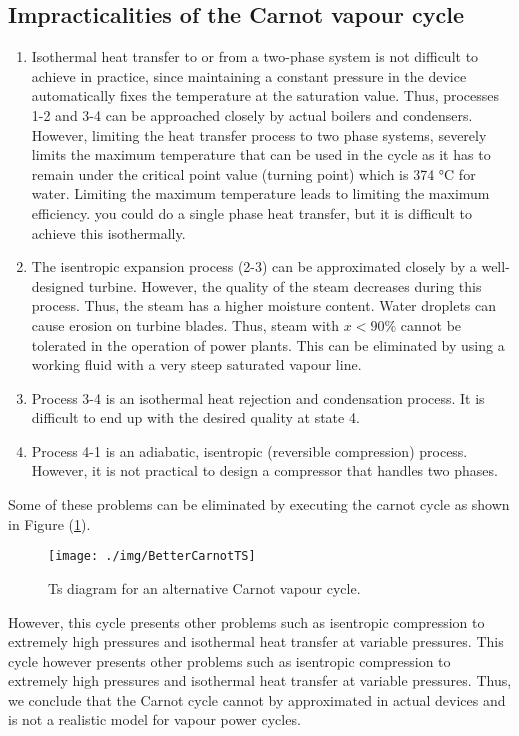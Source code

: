 \subsection{Impracticalities of the Carnot vapour cycle}
\begin{enumerate}[noitemsep]
  \item Isothermal heat transfer to or from a two-phase system is not difficult to achieve in practice, since maintaining a constant pressure in the device automatically fixes the temperature at the saturation value. Thus, processes 1-2 and 3-4 can be approached closely by actual boilers and condensers. However, limiting the heat transfer process to two phase systems, severely limits the maximum temperature that can be used in the cycle as it has to remain under the critical point value (turning point) which is 374 \si{\celsius} for water. Limiting the maximum temperature leads to limiting the maximum efficiency. you could do a single phase heat transfer, but it is difficult to achieve this isothermally.
  \item The isentropic expansion process (2-3) can be approximated closely by a well-designed turbine. However, the quality of the steam decreases during this process. Thus, the steam has a higher moisture content. Water droplets can cause erosion on turbine blades. Thus, steam with $x<90\% $ cannot be tolerated in the operation of power plants. This can be eliminated by using a working fluid with a very steep saturated vapour line.
  \item Process 3-4 is an isothermal heat rejection and condensation process. It is difficult to end up with the desired quality at state 4.
  \item Process 4-1 is an adiabatic, isentropic (reversible compression) process. However, it is not practical to design a compressor that handles two phases.
\end{enumerate}
Some of these problems can be eliminated by executing the carnot cycle as shown in Figure (\ref{BetterCarnot}).
\begin{figure}
  \centering
  \texttt{[image: ./img/BetterCarnotTS]}
  \caption{Ts diagram for an alternative Carnot vapour cycle.}
  \label{BetterCarnot}
\end{figure}
However, this cycle presents other problems such as isentropic compression to extremely high pressures and isothermal heat transfer at variable pressures. This cycle however presents other problems such as isentropic compression to extremely high pressures and isothermal heat transfer at variable pressures. Thus, we conclude that the Carnot cycle cannot by approximated in actual devices and is not a realistic model for vapour power cycles.

